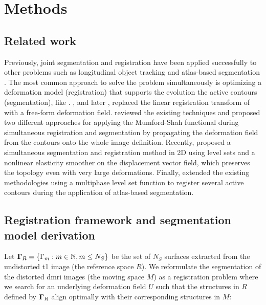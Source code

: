 \section{Methods}
\label{sec:methods}
\subsection{Related work}\label{sec:related_work}
Previously, joint segmentation and registration have been applied successfully to other problems
such as longitudinal object tracking \citep{paragios_level_2003} and atlas-based
  segmentation \citep{gorthi_active_2011}.
The most common approach to solve the problem simultaneously is optimizing a deformation model
  (registration) that supports the evolution the active contours (segmentation), like
  \citep{paragios_level_2003,yezzi_variational_2003}.
\cite{unal_coupled_2005}, and later \cite{wang_joint_2006}, replaced the linear registration
  transform of \citep{yezzi_variational_2003} with a free-form deformation field.
\cite{droske_mumfordshah_2009} reviewed the existing techniques and proposed two different
  approaches for applying the Mumford-Shah functional \citep{mumford_optimal_1989} during simultaneous
  registration and segmentation by propagating the deformation field from
  the contours onto the whole image definition.
Recently, \cite{guyader_combined_2011} proposed a simultaneous segmentation and
  registration method in 2D using level sets and a nonlinear elasticity smoother on the
  displacement vector field, which preserves the topology even with very large deformations.
Finally, \cite{gorthi_active_2011} extended the existing methodologies using a multiphase
  level set function to register several active contours during the application
  of atlas-based segmentation.


\subsection{Registration framework and segmentation model derivation}\label{sec:methods_map}
Let $\boldsymbol{\Gamma}_R = \{\Gamma_m: m \in \mathbb{N}, m \leq N_S\}$ be the set of $N_S$ surfaces
  extracted from the undistorted \gls*{t1} image (the reference space $R$).
We reformulate the segmentation of the distorted \gls*{dmri} images (the moving space $M$)
  as a registration problem where we search for an underlying deformation field $U$ such that
  the structures in $R$ defined by $\boldsymbol{\Gamma}_R$ align optimally with their corresponding
  structures in $M$:

